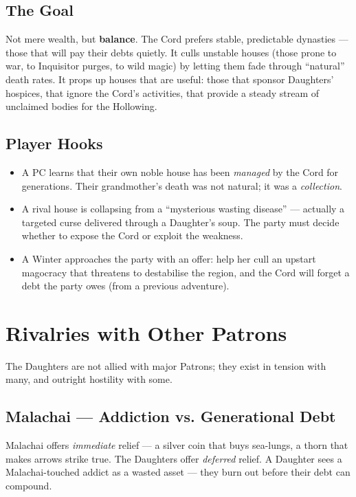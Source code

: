 \documentclass[10pt,twoside]{book}
\begin{document}
\section{The Goal}

Not mere wealth, but \textbf{balance}. The Cord prefers stable, predictable dynasties --- those that will pay their debts quietly. It culls unstable houses (those prone to war, to Inquisitor purges, to wild magic) by letting them fade through ``natural'' death rates. It props up houses that are useful: those that sponsor Daughters' hospices, that ignore the Cord's activities, that provide a steady stream of unclaimed bodies for the Hollowing.

\section{Player Hooks}

\begin{itemize}
\item A PC learns that their own noble house has been \textit{managed} by the Cord for generations. Their grandmother's death was not natural; it was a \textit{collection}.
\item A rival house is collapsing from a ``mysterious wasting disease'' --- actually a targeted curse delivered through a Daughter's soup. The party must decide whether to expose the Cord or exploit the weakness.
\item A Winter approaches the party with an offer: help her cull an upstart magocracy that threatens to destabilise the region, and the Cord will forget a debt the party owes (from a previous adventure).
\end{itemize}

\chapter{Rivalries with Other Patrons}

The Daughters are not allied with major Patrons; they exist in tension with many, and outright hostility with some.

\section{Malachai --- Addiction vs. Generational Debt}
Malachai offers \emph{immediate} relief --- a silver coin that buys sea-lungs, a thorn that makes arrows strike true. The Daughters offer \emph{deferred} relief. A Daughter sees a Malachai-touched addict as a wasted asset --- they burn out before their debt can compound.
\end{document}
